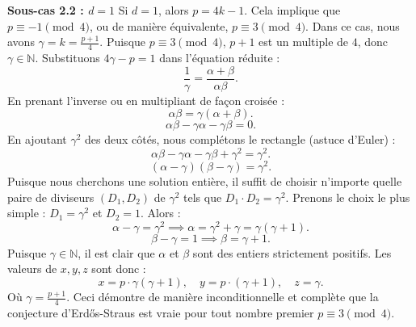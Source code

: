 \documentclass[12pt, a4paper]{article}
\begin{document}
\textbf{Sous-cas 2.2 : $d = 1$}
Si $d = 1$, alors $p = 4k - 1$.
Cela implique que $p \equiv -1 \pmod 4$, ou de manière équivalente, $p \equiv 3 \pmod 4$.
Dans ce cas, nous avons $\gamma = k = \frac{p+1}{4}$.
Puisque $p \equiv 3 \pmod 4$, $p+1$ est un multiple de $4$, donc $\gamma \in \mathbb{N}$.
Substituons $4\gamma - p = 1$ dans l'équation réduite :
\begin{equation}
\frac{1}{\gamma} = \frac{\alpha + \beta}{\alpha\beta}.
\end{equation}
En prenant l'inverse ou en multipliant de façon croisée :
\begin{equation}
\alpha\beta = \gamma(\alpha + \beta).
\end{equation}
\begin{equation}
\alpha\beta - \gamma\alpha - \gamma\beta = 0.
\end{equation}
En ajoutant $\gamma^2$ des deux côtés, nous complétons le rectangle (astuce d'Euler) :
\begin{equation}
\alpha\beta - \gamma\alpha - \gamma\beta + \gamma^2 = \gamma^2.
\end{equation}
\begin{equation}
(\alpha - \gamma)(\beta - \gamma) = \gamma^2.
\end{equation}
Puisque nous cherchons une solution entière, il suffit de choisir n'importe quelle paire de diviseurs $(D_1, D_2)$ de $\gamma^2$ tels que $D_1 \cdot D_2 = \gamma^2$.
Prenons le choix le plus simple : $D_1 = \gamma^2$ et $D_2 = 1$.
Alors :
\begin{equation}
\alpha - \gamma = \gamma^2 \implies \alpha = \gamma^2 + \gamma = \gamma(\gamma + 1).
\end{equation}
\begin{equation}
\beta - \gamma = 1 \implies \beta = \gamma + 1.
\end{equation}
Puisque $\gamma \in \mathbb{N}$, il est clair que $\alpha$ et $\beta$ sont des entiers strictement positifs.
Les valeurs de $x, y, z$ sont donc :
\begin{equation}
x = p \cdot \gamma(\gamma + 1), \quad y = p \cdot (\gamma + 1), \quad z = \gamma.
\end{equation}
Où $\gamma = \frac{p+1}{4}$.
Ceci démontre de manière inconditionnelle et complète que la conjecture d'Erd\H{o}s-Straus est vraie pour tout nombre premier $p \equiv 3 \pmod 4$.

\newpage
\end{document}
